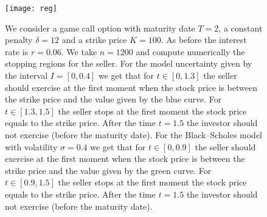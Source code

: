 \documentclass{amsart}
\numberwithin{equation}{section}
\begin{document}
\begin{figure}
\centering
\texttt{[image: reg]}
\caption{We consider a game call option with maturity date $T=2$, a constant penalty $\delta=12$ and a strike price $K=100$.
As before the interest rate is $r=0.06$.
We take $n=1200$ and compute numerically the stopping regions for the seller. For the model uncertainty given by the interval $I=[0,0.4]$
we get that for $t\in [0,1.3]$ the seller should exercise at the first moment when the stock price is between the strike price and the
value given by the blue curve. For $t\in [1.3,1.5]$ the seller stops at the first moment the stock price equals to the strike price.
After the time $t=1.5$ the investor should not exercise (before the maturity date).
For the Black--Scholes model with volatility $\sigma=0.4$ we get that
for $t\in [0,0.9]$ the seller should exercise at the
first moment when the stock price is between the strike price and the
value given by the green curve. For $t\in [0.9,1.5]$ the seller stops at the first moment the stock price equals to the strike price.
After the time $t=1.5$ the investor should not exercise (before the maturity date).}
\end{figure}
\end{document}

